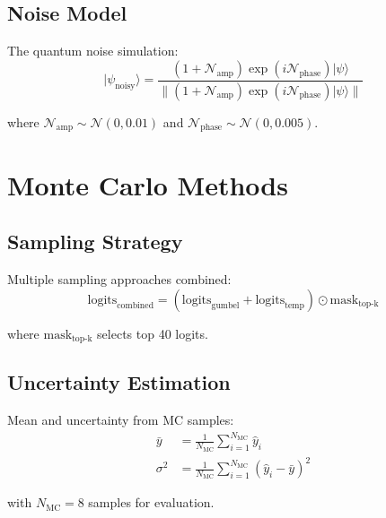 \documentclass{article}
\begin{document}
\subsection{Noise Model}
The quantum noise simulation:
\begin{equation}
|\psi_{\text{noisy}}\rangle = \frac{(1 + \mathcal{N}_{\text{amp}})\exp(i\mathcal{N}_{\text{phase}})|\psi\rangle}{\|(1 + \mathcal{N}_{\text{amp}})\exp(i\mathcal{N}_{\text{phase}})|\psi\rangle\|}
\end{equation}

where $\mathcal{N}_{\text{amp}} \sim \mathcal{N}(0,0.01)$ and $\mathcal{N}_{\text{phase}} \sim \mathcal{N}(0,0.005)$.

\section{Monte Carlo Methods}

\subsection{Sampling Strategy}
Multiple sampling approaches combined:
\begin{equation}
\text{logits}_{\text{combined}} = (\text{logits}_{\text{gumbel}} + \text{logits}_{\text{temp}}) \odot \text{mask}_{\text{top-k}}
\end{equation}

where $\text{mask}_{\text{top-k}}$ selects top 40 logits.

\subsection{Uncertainty Estimation}
Mean and uncertainty from MC samples:
\begin{align*}
\bar{y} &= \frac{1}{N_{\text{MC}}}\sum_{i=1}^{N_{\text{MC}}} \hat{y}_i \\
\sigma^2 &= \frac{1}{N_{\text{MC}}}\sum_{i=1}^{N_{\text{MC}}}(\hat{y}_i - \bar{y})^2
\end{align*}

with $N_{\text{MC}}=8$ samples for evaluation.



\end{document}
